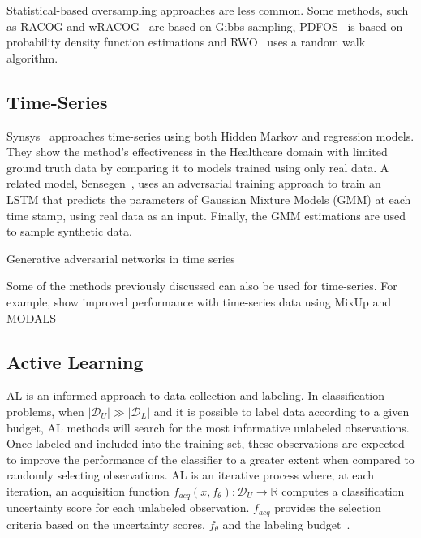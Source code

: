 \documentclass[parskip=full]{scrartcl}
\begin{document}
Statistical-based oversampling approaches are less common. Some methods, such
as RACOG and wRACOG~\cite{das2014racog} are based on Gibbs sampling,
PDFOS~\cite{gao2014pdfos} is based on probability density function
estimations and RWO~\cite{zhang2014rwo} uses a random walk algorithm.

\subsection{Time-Series}


Synsys~\cite{dahmen2019synsys} approaches time-series using both Hidden Markov
and regression models. They show the method's effectiveness in the Healthcare
domain with limited ground truth data by comparing it to models trained using
only real data. A related model, Sensegen~\cite{alzantot2017sensegen}, uses an
adversarial training approach to train an LSTM that predicts the parameters
of Gaussian Mixture Models (GMM) at each time stamp, using real data as
an input. Finally, the GMM estimations are used to sample synthetic data. 


Generative adversarial networks in time series 


Some of the methods previously discussed can also be used for time-series. For
example, \citet{cheung2020modals} show improved performance with time-series
data using MixUp and MODALS


\subsection{Active Learning}\label{sec:active-learning}

AL is an informed approach to data collection and labeling. In classification
problems, when $|\mathcal{D}_U| \gg |\mathcal{D}_L|$ and it is possible to
label data according to a given budget, AL methods will search for the most
informative unlabeled observations. Once labeled and included into the
training set, these observations are expected to improve the performance of
the classifier to a greater extent when compared to randomly selecting
observations. AL is an iterative process where, at each iteration, an
acquisition function $f_{acq}(x, f_\theta): \mathcal{D}_U \to \mathbb{R}$
computes a classification uncertainty score for each unlabeled observation.
$f_{acq}$ provides the selection criteria based on the uncertainty scores,
$f_\theta$ and the labeling budget~\cite{kim2021lada}.
\end{document}
